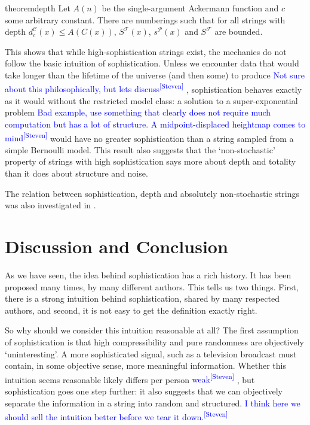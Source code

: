 \documentclass{style/llncs}
\newcommand{\C}{\mathscr C}
\newcommand{\T}{\mathscr T}
\newcommand{\F}{\mathscr F}
\renewcommand{\P}{\mathscr P}
\newcommand{\s}{S}
\newcommand{\sdr}[1]{\textcolor{blue}{\small #1\textsuperscript{[Steven]} }}
\begin{document}
\begin{restatable}{theorem}{depth}
Let $A(n)$ be the single-argument Ackermann function and $c$ some arbitrary constant. There are numberings such that for all strings with depth $d^\C_c(x) \leq A(C(x))$, $\s^\T(x)$, $s^\P(x)$ and $\s^\F$ are bounded.
\end{restatable}
\noindent This shows that while high-sophistication strings exist, the mechanics do not follow the basic intuition of sophistication. Unless we encounter data that would take longer than the lifetime of the universe (and then some) to produce \sdr{Not sure about this philosophically, but lets discuss}, sophistication behaves exactly as it would without the restricted model class: a solution to a super-exponential problem \sdr{Bad example, use something that clearly does not require much computation but has a lot of structure. A midpoint-displaced heightmap comes to mind} would have no greater sophistication than a string sampled from a simple Bernoulli model. This result also suggests that the `non-stochastic' property of strings with high sophistication\cite{shen1983concept,vereshchagin2004kolmogorov} says more about depth and totality than it does about structure and noise.

The relation between sophistication, depth and absolutely non-stochastic strings was also investigated in \cite{antunes2013sophistication}.

\section{Discussion and Conclusion}
\label{section:conclusion}
As we have seen, the idea behind sophistication has a rich history. It has been proposed many times, by many different authors. This tells us two things. First, there is a strong intuition behind sophistication, shared by many respected authors, and second, it is not easy to get the definition exactly right.

So why should we consider this intuition reasonable at all? The first assumption of sophistication is that high compressibility and pure randomness are objectively `uninteresting'. A more sophisticated signal, such as a television broadcast must contain, in some objective sense, more meaningful information. Whether this intuition seems reasonable likely differs per person \sdr{weak}, but sophistication goes one step further: it also suggests that we can objectively separate the information in a string into random and structured. \sdr{I think here we should sell the intuition better before we tear it down.}
\end{document}
